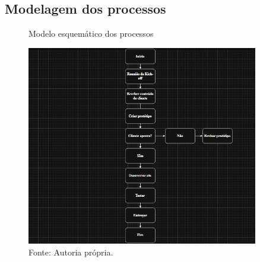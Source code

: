 \subsection{Modelagem dos processos}

\begin{figure} [h!]	
    \centering

    \caption{Modelo esquemático dos processos}
    \includegraphics[width=0.9\textwidth]{Figures/modelo_esquematico_dos_processos.png}
    \caption*{Fonte: Autoria própria.}
    \label{fig:modelagem_dos_processos}
\end{figure}
